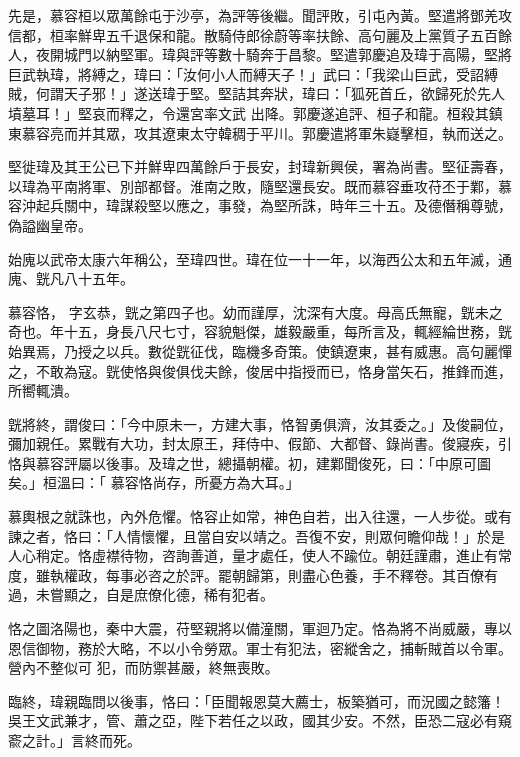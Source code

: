 \begin{pinyinscope}
 先是，慕容桓以眾萬餘屯于沙亭，為評等後繼。聞評敗，引屯內黃。堅遣將鄧羌攻信都，桓率鮮卑五千退保和龍。散騎侍郎徐蔚等率扶餘、高句麗及上黨質子五百餘人，夜開城門以納堅軍。瑋與評等數十騎奔于昌黎。堅遣郭慶追及瑋于高陽，堅將巨武執瑋，將縛之，瑋曰：「汝何小人而縛天子！」武曰：「我梁山巨武，受詔縛賊，何謂天子邪！」遂送瑋于堅。堅詰其奔狀，瑋曰：「狐死首丘，欲歸死於先人墳墓耳！」堅哀而釋之，令還宮率文武
 出降。郭慶遂追評、桓子和龍。桓殺其鎮東慕容亮而并其眾，攻其遼東太守韓稠于平川。郭慶遣將軍朱嶷擊桓，執而送之。



 堅徙瑋及其王公已下并鮮卑四萬餘戶于長安，封瑋新興侯，署為尚書。堅征壽春，以瑋為平南將軍、別部都督。淮南之敗，隨堅還長安。既而慕容垂攻苻丕于鄴，慕容沖起兵關中，瑋謀殺堅以應之，事發，為堅所誅，時年三十五。及德僭稱尊號，偽謚幽皇帝。



 始廆以武帝太康六年稱公，至瑋四世。瑋在位一十一年，以海西公太和五年滅，通廆、皝凡八十五年。



 慕容恪，
 字玄恭，皝之第四子也。幼而謹厚，沈深有大度。母高氏無寵，皝未之奇也。年十五，身長八尺七寸，容貌魁傑，雄毅嚴重，每所言及，輒經綸世務，皝始異焉，乃授之以兵。數從皝征伐，臨機多奇策。使鎮遼東，甚有威惠。高句麗憚之，不敢為寇。皝使恪與俊俱伐夫餘，俊居中指授而已，恪身當矢石，推鋒而進，所嚮輒潰。



 皝將終，謂俊曰：「今中原未一，方建大事，恪智勇俱濟，汝其委之。」及俊嗣位，彌加親任。累戰有大功，封太原王，拜侍中、假節、大都督、錄尚書。俊寢疾，引恪與慕容評屬以後事。及瑋之世，總攝朝權。初，建鄴聞俊死，曰：「中原可圖矣。」桓溫曰：「
 慕容恪尚存，所憂方為大耳。」



 慕輿根之就誅也，內外危懼。恪容止如常，神色自若，出入往還，一人步從。或有諫之者，恪曰：「人情懷懼，且當自安以靖之。吾復不安，則眾何瞻仰哉！」於是人心稍定。恪虛襟待物，咨詢善道，量才處任，使人不踰位。朝廷謹肅，進止有常度，雖執權政，每事必咨之於評。罷朝歸第，則盡心色養，手不釋卷。其百僚有過，未嘗顯之，自是庶僚化德，稀有犯者。



 恪之圖洛陽也，秦中大震，苻堅親將以備潼關，軍迴乃定。恪為將不尚威嚴，專以恩信御物，務於大略，不以小令勞眾。軍士有犯法，密縱舍之，捕斬賊首以令軍。營內不整似可
 犯，而防禦甚嚴，終無喪敗。



 臨終，瑋親臨問以後事，恪曰：「臣聞報恩莫大薦士，板築猶可，而況國之懿籓！吳王文武兼才，管、蕭之亞，陛下若任之以政，國其少安。不然，臣恐二寇必有窺窬之計。」言終而死。




\end{pinyinscope}
